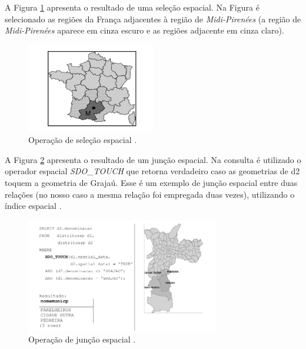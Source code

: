 A Figura \ref{fig:SelecaoEspacial} apresenta o resultado de uma seleção espacial. Na Figura é selecionado as regiões da França adjacentes à região de \textit{Midi-Pirenées} (a região de \textit{Midi-Pirenées} aparece em cinza escuro e as regiões adjacente em cinza claro).

\begin{figure}[h]
\centering
\includegraphics[width=0.50\textwidth]{./img/cap_II/17-SelecaoEspacial}
\caption{Operação de seleção espacial \cite{queirozferreira}.}
\label{fig:SelecaoEspacial}
\end{figure}

A Figura \ref{fig:JuncaoEspacial} apresenta o resultado de um junção espacial. Na consulta é utilizado o operador  espacial \textit{SDO\_TOUCH} que retorna verdadeiro caso as geometrias de d2 toquem a geometria de Grajaú. Esse é um exemplo de junção espacial entre duas relações (no nosso caso a mesma relação foi empregada duas vezes), utilizando o índice espacial \cite{queirozferreira}.

\newpage

\begin{figure}[h]
\centering
\includegraphics[width=0.75\textwidth]{./img/cap_II/19-JuncaoEspacial}
\caption{Operação de junção espacial \cite{queirozferreira}.}
\label{fig:JuncaoEspacial}
\end{figure}
